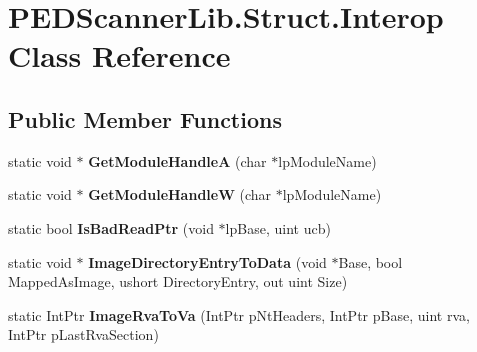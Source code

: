\hypertarget{class_p_e_d_scanner_lib_1_1_struct_1_1_interop}{}\section{P\+E\+D\+Scanner\+Lib.\+Struct.\+Interop Class Reference}
\label{class_p_e_d_scanner_lib_1_1_struct_1_1_interop}
\subsection*{Public Member Functions}
\begin{DoxyCompactItemize}
\item 
\mbox{\label{class_p_e_d_scanner_lib_1_1_struct_1_1_interop_a84a2a6209e0765dc550351642bb9c3d7}} 
static void $\ast$ {\bfseries Get\+Module\+HandleA} (char $\ast$lp\+Module\+Name)
\item 
\mbox{\label{class_p_e_d_scanner_lib_1_1_struct_1_1_interop_a9adb1425939675e4bb2089a3a25132af}} 
static void $\ast$ {\bfseries Get\+Module\+HandleW} (char $\ast$lp\+Module\+Name)
\item 
\mbox{\label{class_p_e_d_scanner_lib_1_1_struct_1_1_interop_ad51a924319e3af8f37853860f52ded42}} 
static bool {\bfseries Is\+Bad\+Read\+Ptr} (void $\ast$lp\+Base, uint ucb)
\item 
\mbox{\label{class_p_e_d_scanner_lib_1_1_struct_1_1_interop_ad026a33a9699d74f6fe8c7fac1b6d890}} 
static void $\ast$ {\bfseries Image\+Directory\+Entry\+To\+Data} (void $\ast$Base, bool Mapped\+As\+Image, ushort Directory\+Entry, out uint Size)
\item 
\mbox{\label{class_p_e_d_scanner_lib_1_1_struct_1_1_interop_a7e67ab62ee7c29cf8940eec1db41fc0f}} 
static Int\+Ptr {\bfseries Image\+Rva\+To\+Va} (Int\+Ptr p\+Nt\+Headers, Int\+Ptr p\+Base, uint rva, Int\+Ptr p\+Last\+Rva\+Section)
\item 
\mbox{\label{class_p_e_d_scanner_lib_1_1_struct_1_1_interop_abf490187652508db85aa44999b0bd032}} 

\end{DoxyCompactItemize}
